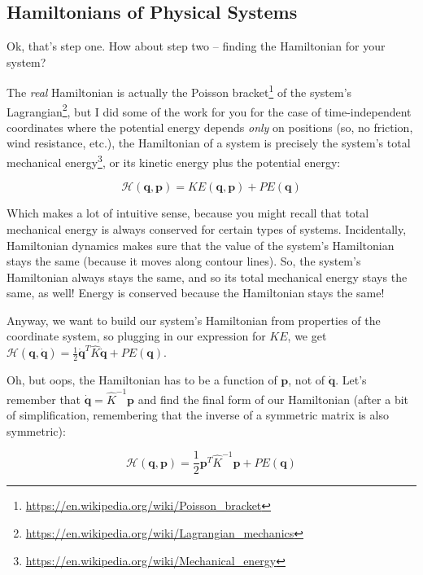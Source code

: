 \documentclass[]{article}
\renewcommand{\href}[2]{#2\footnote{\url{#1}}}
\begin{document}
\subsection{Hamiltonians of Physical
Systems}\label{hamiltonians-of-physical-systems}

Ok, that's step one. How about step two -- finding the Hamiltonian for your
system?

The \emph{real} Hamiltonian is actually the
\href{https://en.wikipedia.org/wiki/Poisson_bracket}{Poisson bracket} of the
system's \href{https://en.wikipedia.org/wiki/Lagrangian_mechanics}{Lagrangian},
but I did some of the work for you for the case of time-independent coordinates
where the potential energy depends \emph{only} on positions (so, no friction,
wind resistance, etc.), the Hamiltonian of a system is precisely the system's
total \href{https://en.wikipedia.org/wiki/Mechanical_energy}{mechanical energy},
or its kinetic energy plus the potential energy:

\[
\mathcal{H}(\mathbf{q},\mathbf{p}) = KE(\mathbf{q},\mathbf{p}) + PE(\mathbf{q})
\]

Which makes a lot of intuitive sense, because you might recall that total
mechanical energy is always conserved for certain types of systems.
Incidentally, Hamiltonian dynamics makes sure that the value of the system's
Hamiltonian stays the same (because it moves along contour lines). So, the
system's Hamiltonian always stays the same, and so its total mechanical energy
stays the same, as well! Energy is conserved because the Hamiltonian stays the
same!

Anyway, we want to build our system's Hamiltonian from properties of the
coordinate system, so plugging in our expression for \(KE\), we get
\(\mathcal{H}(\mathbf{q},\dot{\mathbf{q}}) = \frac{1}{2} \dot{\mathbf{q}}^T \hat{K} \dot{\mathbf{q}} + PE(\mathbf{q})\).

Oh, but oops, the Hamiltonian has to be a function of \(\mathbf{p}\), not of
\(\dot{\mathbf{q}}\). Let's remember that
\(\dot{\mathbf{q}} = \hat{K}^{-1} \mathbf{p}\) and find the final form of our
Hamiltonian (after a bit of simplification, remembering that the inverse of a
symmetric matrix is also symmetric):

\[
\mathcal{H}(\mathbf{q},\mathbf{p}) = \frac{1}{2} \mathbf{p}^T \hat{K}^{-1} \mathbf{p} + PE(\mathbf{q})
\]
\end{document}
